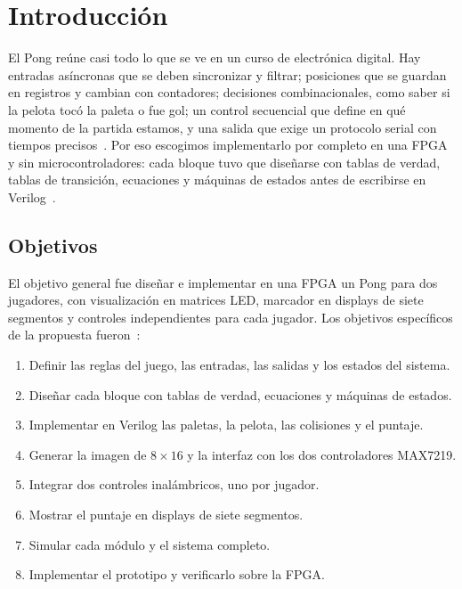 \documentclass[conference,a4paper]{IEEEtran}
\begin{document}
\section{Introducción}

El Pong reúne casi todo lo que se ve en un curso de electrónica digital. Hay entradas asíncronas que se deben sincronizar y filtrar; posiciones que se guardan en registros y cambian con contadores; decisiones combinacionales, como saber si la pelota tocó la paleta o fue gol; un control secuencial que define en qué momento de la partida estamos, y una salida que exige un protocolo serial con tiempos precisos~\cite{mano,brown,tocci}. Por eso escogimos implementarlo por completo en una FPGA y sin microcontroladores: cada bloque tuvo que diseñarse con tablas de verdad, tablas de transición, ecuaciones y máquinas de estados antes de escribirse en Verilog~\cite{propuesta}.

\subsection{Objetivos}

El objetivo general fue diseñar e implementar en una FPGA un Pong para dos jugadores, con visualización en matrices LED, marcador en displays de siete segmentos y controles independientes para cada jugador. Los objetivos específicos de la propuesta fueron~\cite{propuesta}:
\begin{enumerate}
\item Definir las reglas del juego, las entradas, las salidas y los estados del sistema.
\item Diseñar cada bloque con tablas de verdad, ecuaciones y máquinas de estados.
\item Implementar en Verilog las paletas, la pelota, las colisiones y el puntaje.
\item Generar la imagen de $8\times16$ y la interfaz con los dos controladores MAX7219.
\item Integrar dos controles inalámbricos, uno por jugador.
\item Mostrar el puntaje en displays de siete segmentos.
\item Simular cada módulo y el sistema completo.
\item Implementar el prototipo y verificarlo sobre la FPGA.
\end{enumerate}
\end{document}
